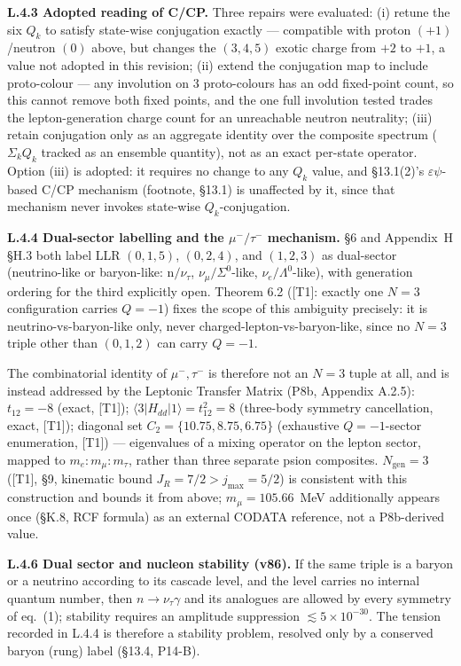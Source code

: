 \documentclass[11pt,letterpaper]{article}
\begin{document}
\noindent \textbf{L.4.3 Adopted reading of C/CP.} Three repairs were evaluated: (i) retune the six $Q_k$ to satisfy state-wise conjugation exactly --- compatible with proton $(+1)$/neutron $(0)$ above, but changes the $(3,4,5)$ exotic charge from $+2$ to $+1$, a value not adopted in this revision; (ii) extend the conjugation map to include proto-colour --- any involution on 3 proto-colours has an odd fixed-point count, so this cannot remove both fixed points, and the one full involution tested trades the lepton-generation charge count for an unreachable neutron neutrality; (iii) retain conjugation only as an aggregate identity over the composite spectrum ($\Sigma_k Q_k$ tracked as an ensemble quantity), not as an exact per-state operator. Option (iii) is adopted: it requires no change to any $Q_k$ value, and \S13.1(2)'s $\varepsilon\psi$-based C/CP mechanism (footnote, \S13.1) is unaffected by it, since that mechanism never invokes state-wise $Q_k$-conjugation.

\noindent \textbf{L.4.4 Dual-sector labelling and the $\mu^-/\tau^-$ mechanism.} \S6 and Appendix~H \S H.3 both label LLR $(0,1,5)$, $(0,2,4)$, and $(1,2,3)$ as dual-sector (neutrino-like or baryon-like: n$/\nu_\tau$, $\nu_\mu/\Sigma^0$-like, $\nu_e/\Lambda^0$-like), with generation ordering for the third explicitly open. Theorem 6.2 ([T1]: exactly one $N=3$ configuration carries $Q=-1$) fixes the scope of this ambiguity precisely: it is neutrino-vs-baryon-like only, never charged-lepton-vs-baryon-like, since no $N=3$ triple other than $(0,1,2)$ can carry $Q=-1$.

\noindent The combinatorial identity of $\mu^-,\tau^-$ is therefore not an $N=3$ tuple at all, and is instead addressed by the Leptonic Transfer Matrix (P8b, Appendix A.2.5): $t_{12}=-8$ (exact, [T1]); $\langle 3|H_{dd}|1\rangle = t_{12}^2=8$ (three-body symmetry cancellation, exact, [T1]); diagonal set $C_2=\{10.75, 8.75, 6.75\}$ (exhaustive $Q=-1$-sector enumeration, [T1]) --- eigenvalues of a mixing operator on the lepton sector, mapped to $m_e:m_\mu:m_\tau$, rather than three separate psion composites. $N_{\mathrm{gen}}=3$ ([T1], \S9, kinematic bound $J_R=7/2>j_{\max}=5/2$) is consistent with this construction and bounds it from above; $m_\mu=105.66$~MeV additionally appears once (\S K.8, RCF formula) as an external CODATA reference, not a P8b-derived value.

\noindent \textbf{L.4.6 Dual sector and nucleon stability (v86).} If the same triple is a baryon or a neutrino according to its cascade level, and the level carries no internal quantum number, then $n\to\nu_\tau\gamma$ and its analogues are allowed by every symmetry of eq.~(1); stability requires an amplitude suppression $\lesssim5\times10^{-30}$. The tension recorded in L.4.4 is therefore a stability problem, resolved only by a conserved baryon (rung) label (§13.4, P14-B).
\end{document}

